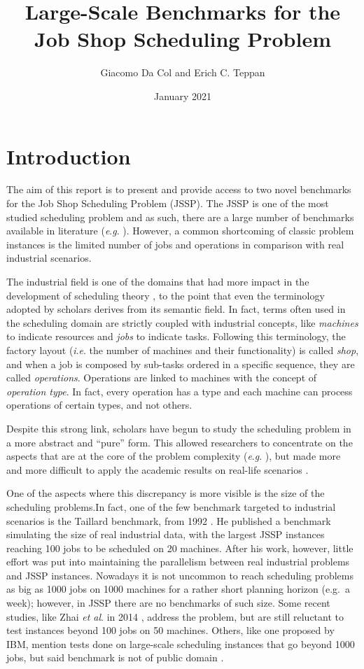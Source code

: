 \documentclass{article}
\title{Large-Scale Benchmarks for the Job Shop Scheduling Problem}
\author{Giacomo Da Col and Erich C. Teppan}
\date{January 2021}
\newcommand{\etal}{\textit{et al}. }
\newcommand{\ie}{\textit{i}.\textit{e}. }
\newcommand{\eg}{\textit{e}.\textit{g}. }
\begin{document}
\maketitle

\section{Introduction}
The aim of this report is to present and provide access to two novel benchmarks for the Job Shop Scheduling Problem (JSSP). The JSSP is one of the most studied scheduling problem and as such, there are a large number of benchmarks available in literature (\eg \cite{lawrence,taillard,adams,storer,apple}). However, a common shortcoming of classic problem instances is the limited number of jobs and operations in comparison with real industrial scenarios. 

The industrial field is one of the domains that had more impact in the development of scheduling theory \cite{fisher,Blazewicz2007,baker2013}, to the point that even the terminology adopted by scholars derives from its semantic field. In fact, terms often used in the scheduling domain are strictly coupled with industrial concepts, like \emph{machines} to indicate resources and \emph{jobs} to indicate tasks. Following this terminology, the factory layout (\ie the number of machines and their functionality) is called \emph{shop}, and when a job is composed by sub-tasks ordered in a specific sequence, they are called \emph{operations}. Operations are linked to machines with the concept of \emph{operation type}. In fact, every operation has a type and each machine can process operations of certain types, and not others. 
 
Despite this strong link, scholars have begun to study the scheduling problem in a more abstract and ``pure'' form. This allowed researchers to concentrate on the aspects that are at the core of the problem complexity (\eg \cite{garey1976}), but made more and more difficult to apply the academic results on real-life scenarios \cite{fuchigami2017}. 

One of the aspects where this discrepancy is more visible is the size of the scheduling problems.In fact, one of the few benchmark targeted to industrial scenarios is the Taillard benchmark, from 1992 \cite{taillard}. He published a benchmark simulating the size of real industrial data, with the largest JSSP instances reaching 100 jobs to be scheduled on 20 machines. After his work, however, little effort was put into maintaining the parallelism between real industrial problems and JSSP instances. Nowadays it is not uncommon to reach scheduling problems as big as 1000 jobs on 1000 machines for a rather short planning horizon (e.g.\ a week); however, in JSSP there are no benchmarks of such size. Some recent studies, like Zhai \etal in 2014 \cite{zhai2014}, address the problem, but are still reluctant to test instances beyond 100 jobs on 50 machines. Others, like one proposed by IBM, mention tests done on large-scale scheduling instances that go beyond 1000 jobs, but said benchmark is not of public domain \cite{laborie2018ibm}. 
\end{document}
